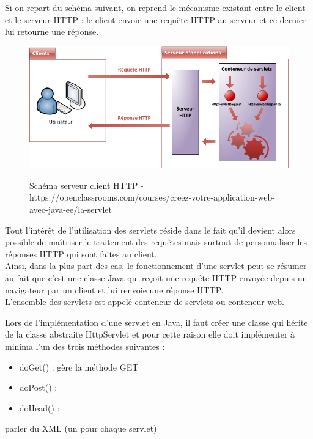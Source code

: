Si on repart du schéma suivant, on reprend le mécanisme existant entre le client
et le serveur HTTP : le client envoie une requête HTTP au serveur et ce dernier
lui retourne une réponse.\\
\begin{figure}[H]
  \center
  \includegraphics[scale=0.5]{../graph/serveurclient.png} \\
  \caption{Schéma serveur client HTTP - https://openclassrooms.com/courses/creez-votre-application-web-avec-java-ee/la-servlet}
\end{figure}

Tout l'intérêt de l'utilisation des servlets réside dans le fait qu'il devient
alors possible de maîtriser le traitement des requêtes mais surtout de personnaliser
les réponses HTTP qui sont faites au client.\\

Ainsi, dans la plus part des cas, le fonctionnement d'une servlet peut se résumer
au fait que c'est une classe Java qui reçoit une requête HTTP envoyée depuis un
navigateur par un client et lui renvoie une réponse HTTP.\\

L'ensemble des servlets est appelé conteneur de servlets ou conteneur web.

Lors de l'implémentation d'une servlet en Java, il faut créer une classe qui hérite
de la classe abstraite HttpServlet et pour cette raison elle doit implémenter à
minima l'un des trois méthodes suivantes :
\begin{itemize}
 \item doGet() : gère la méthode GET 
 \item doPost() :
 \item doHead() :
\end{itemize}


parler du XML (un pour chaque servlet)




